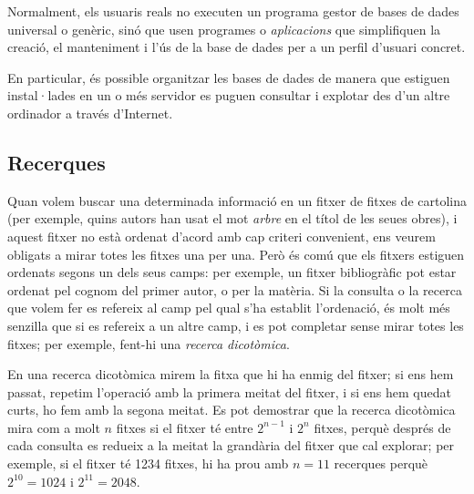 Normalment, els usuaris reals no executen un programa gestor de bases
de dades universal o genèric, sinó que usen programes o \emph{aplicacions} que
simplifiquen la creació, el manteniment i l'ús de la base de dades per
a un perfil d'usuari concret.

En particular, és possible organitzar les bases de dades de manera que
estiguen instal·lades en un o més servidor es puguen consultar i
explotar des d'un altre ordinador a través d'Internet.


\subsection{Recerques}

Quan volem buscar una determinada informació en un fitxer de fitxes de
cartolina (per exemple, quins autors han usat el
mot \emph{arbre} en el
títol de les seues obres), i aquest fitxer no està ordenat d'acord amb cap
criteri convenient, ens veurem obligats a mirar totes les fitxes una
per una.  Però és comú que els fitxers estiguen ordenats segons un
dels seus camps: per exemple, un fitxer bibliogràfic pot estar ordenat
pel cognom del primer autor, o per la matèria. Si la consulta o la
recerca que volem fer es refereix al camp pel qual s'ha establit
l'ordenació, és molt més senzilla que si es refereix a un altre camp,
i es pot completar sense mirar totes les fitxes; per exemple, fent-hi
una \emph{recerca dicotòmica}.

En una recerca dicotòmica mirem la fitxa que hi ha enmig del fitxer;
si ens hem passat, repetim l'operació amb la primera meitat del
fitxer, i si ens hem quedat curts, ho fem amb la segona meitat. Es pot
demostrar que la recerca dicotòmica mira com a molt $n$ fitxes si el
fitxer té entre $2^{n-1}$ i $2^n$ fitxes, perquè després de cada
consulta es redueix a la meitat la grandària del fitxer que cal
explorar; per exemple, si el fitxer té 1234 fitxes, hi ha prou amb
$n=11$ recerques perquè $2^{10}=1024$ i $2^{11}=2048$.

